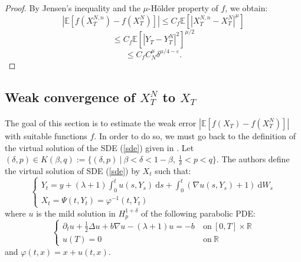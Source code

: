 \documentclass[12pt]{article}
\newcommand{\R}{\mathbb{R}}
\newcommand{\E}{\mathbb{E}}
\newcommand{\di}{\mathrm{d}}
\begin{document}
        \begin{proof}
            By Jensen's inequality and the $\mu$-Hölder property of $f$, we obtain:
            \begin{equation*}
            \left|\E\left[f\left(X_T^{N,n}\right)-f\left(X_T^N\right)\right]\right| \leq C_f  \E\left[\left|X_T^{N,n}-X_T^N\right|^\mu\right]
            \end{equation*}
            \begin{equation*}
             \leq  C_f  \E\left[\left|Y_T-Y_T^N\right|^2\right]^{\mu/2}
            \end{equation*}
            \begin{equation*}
            \leq C_f  C_N^\mu\delta^{\mu/4-\varepsilon}.
            \end{equation*}
        \end{proof}
    
    \subsection{Weak convergence of $X^{N}_T$ to $X_T$}
        \paragraph{}
        The goal of this section is to estimate the weak error $\left|\E\left[f\left(X_T\right)-f\left(X_T^N\right)\right]\right|$ with suitable functions $f$. In order to do so, we must go back to the definition of the virtual solution of the SDE (\ref{sde}) given in \cite{Fla-Iss-Rus-2017}. Let $(\delta,p)\in K(\beta,q):=\{(\delta,p)\ |\ \beta<\delta<1-\beta,\ \frac{1}{\delta}<p<q\}$. The authors define the virtual solution of SDE (\ref{sde}) by $X_t$ such that:
        \begin{equation}\label{virtual}
        \begin{cases}
        Y_t = y + (\lambda+1)\int_0^t u(s,Y_s)\ \di s +\int_0^t (\nabla u(s,Y_s)+1)\ \di W_s \\X_t = \Psi(t,Y_t) = \varphi^{-1}(t,Y_t)
        \end{cases}
        \end{equation}
        where $u$ is the mild solution in $H_p^{1+\delta}$ of the following parabolic PDE:
        \begin{equation}\label{pde}
        \begin{cases}
        \partial_t u + \frac{1}{2}\Delta u + b\nabla u - (\lambda+1)u = -b\ &\mathrm{on}\ [0,T]\times\R\\
        u(T) = 0\ &\mathrm{on}\ \R
        \end{cases}
        \end{equation}
        and $\varphi(t,x) = x + u(t,x)$.
        
\end{document}
